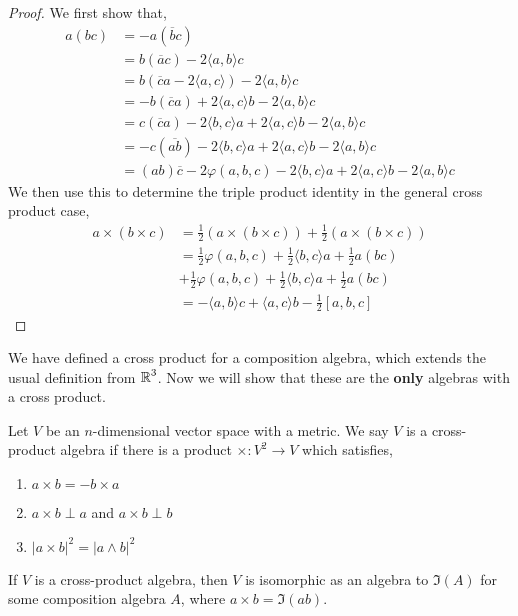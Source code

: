 \begin{proof}
We first show that,
    \begin{align*}
        a(bc) &= -a(\overline{b}c)\\
        &= b(\overline{a}c)-2\langle a,b\rangle c\\
        &= b(\overline{c}a-2\langle a,c\rangle)-2\langle a,b\rangle c\\
        &= -b(\overline{c}a)+2\langle a,c\rangle b-2\langle a,b\rangle c\\
        &= c(\overline{c}a)-2\langle b,c\rangle a+2\langle a,c\rangle b - 2\langle a,b\rangle c\\
        &= -c(\overline{ab})-2\langle b,c\rangle a + 2\langle a,c\rangle b - 2\langle a,b\rangle c\\
        &= (ab)\overline{c}-2\varphi(a,b,c)-2\langle b,c\rangle a + 2\langle a,c\rangle b -2\langle a,b\rangle c
    \end{align*}
    We then use this to determine the triple product identity in the general cross product case,
    \begin{align*}
        a\times(b\times c) &= \frac{1}{2}(a\times(b\times c))+\frac{1}{2}(a\times(b\times c))\\
        &= \frac{1}{2}\varphi(a,b,c)+\frac{1}{2}\langle b,c\rangle a + \frac{1}{2}a(bc)\\
        &+\frac{1}{2}\varphi(a,b,c)+\frac{1}{2}\langle b,c\rangle a+\frac{1}{2}a(bc)\\
        &= -\langle a,b\rangle c+\langle a,c\rangle b - \frac{1}{2}[a,b,c]
    \end{align*}
\end{proof}
We have defined a cross product for a composition algebra, which extends the usual definition from $\operatorname{\mathbb{R}}^3$. Now we will show that these are the \textbf{only} algebras with a cross product.
\begin{defn}
    Let $V$ be an $n$-dimensional vector space with a metric. We say $V$ is a cross-product algebra if there is a product $\times : V^2 \to V$ which satisfies,
    \begin{enumerate}
        \item $a\times b = -b\times a$
        \item $a \times b \perp a$ and $a\times b \perp b$
        \item $|a\times b|^2 = |a\wedge b|^2$
    \end{enumerate}
\end{defn}
\begin{thm}
    If $V$ is a cross-product algebra, then $V$ is isomorphic as an algebra to $\Im(A)$ for some composition algebra $A$, where $a\times b=\Im(ab)$.
\end{thm}
